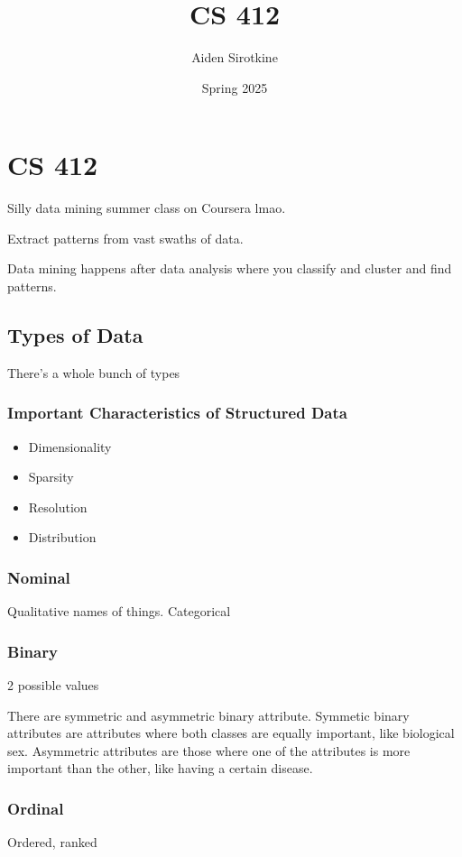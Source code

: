 \documentclass[fleqn]{report}
\date{Spring 2025}
\title{CS 412}
\author{Aiden Sirotkine}
\begin{document}
\graphicspath{ {../Images/} }
\pagestyle{fancy}
\maketitle
\tableofcontents
\clearpage

\chapter{CS 412}
Silly data mining summer class on Coursera lmao. 

Extract patterns from vast swaths of data. 

Data mining happens after data analysis where you classify and cluster 
and find patterns. 

\section{Types of Data}
There's a whole bunch of types 

\subsection{Important Characteristics of Structured Data }
\begin{itemize}
    \item 
    Dimensionality 
    \item 
    Sparsity 
    \item 
    Resolution 
    \item 
    Distribution
\end{itemize}

\subsection{Nominal}
Qualitative names of things. 
Categorical 

\subsection{Binary}
2 possible values 

There are symmetric and asymmetric binary attribute. Symmetic binary 
attributes are attributes where both classes are equally important, like 
biological sex. Asymmetric attributes are those where one of the attributes 
is more important than the other, like having a certain disease. 

\subsection{Ordinal}
Ordered, ranked 
\end{document}
